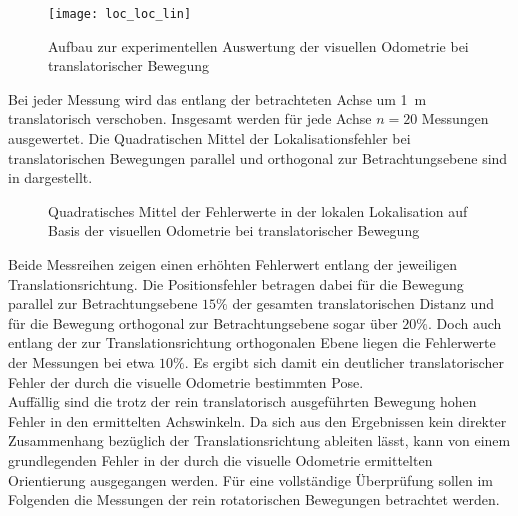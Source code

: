 \begin{figure}[!ht]
	\begin{center}
		\texttt{[image: loc\_loc\_lin]}
		\caption{Aufbau zur experimentellen Auswertung der visuellen Odometrie bei translatorischer Bewegung}
		\label{fig.transmove}
	\end{center}
\end{figure}

Bei jeder Messung wird das \kps{} entlang der betrachteten Achse um \SI{1}{\meter} translatorisch verschoben. Insgesamt werden für jede Achse $n=20$ Messungen ausgewertet. Die Quadratischen Mittel der Lokalisationsfehler bei translatorischen Bewegungen parallel und orthogonal zur Betrachtungsebene sind in  dargestellt.\\

\begin{figure}

\caption{Quadratisches Mittel der Fehlerwerte in der lokalen Lokalisation auf Basis der visuellen Odometrie bei translatorischer Bewegung}
\label{fig.loc_loc_trans}
\end{figure}

Beide Messreihen zeigen einen erhöhten Fehlerwert entlang der jeweiligen Translationsrichtung. Die Positionsfehler betragen dabei für die Bewegung parallel zur Betrachtungsebene $15\%$ der gesamten translatorischen Distanz und für die Bewegung orthogonal zur Betrachtungsebene sogar über $20\%$. Doch auch entlang der zur Translationsrichtung orthogonalen Ebene liegen die Fehlerwerte der Messungen bei etwa $10\%$. Es ergibt sich damit ein deutlicher translatorischer Fehler der durch die visuelle Odometrie bestimmten Pose.\\

Auffällig sind die trotz der rein translatorisch ausgeführten Bewegung hohen Fehler in den ermittelten Achswinkeln. Da sich aus den Ergebnissen kein direkter Zusammenhang bezüglich der Translationsrichtung ableiten lässt, kann von einem grundlegenden Fehler in der durch die visuelle Odometrie ermittelten Orientierung ausgegangen werden. Für eine vollständige Überprüfung sollen im Folgenden die Messungen der rein rotatorischen Bewegungen betrachtet werden.


